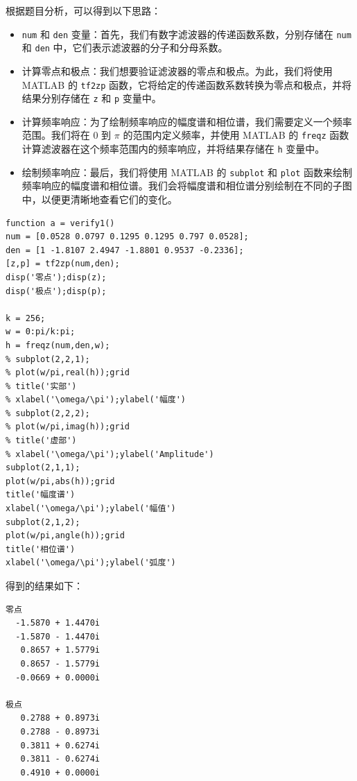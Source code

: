 \documentclass[a4paper,12pt]{article}
\begin{document}
根据题目分析，可以得到以下思路：

\begin{itemize}
    \item \texttt{num} 和 \texttt{den} 变量：首先，我们有数字滤波器的传递函数系数，分别存储在 \texttt{num} 和 \texttt{den} 中，它们表示滤波器的分子和分母系数。
    
    \item 计算零点和极点：我们想要验证滤波器的零点和极点。为此，我们将使用 MATLAB 的 \texttt{tf2zp} 函数，它将给定的传递函数系数转换为零点和极点，并将结果分别存储在 \texttt{z} 和 \texttt{p} 变量中。
    
    \item 计算频率响应：为了绘制频率响应的幅度谱和相位谱，我们需要定义一个频率范围。我们将在 0 到 $\pi$ 的范围内定义频率，并使用 MATLAB 的 \texttt{freqz} 函数计算滤波器在这个频率范围内的频率响应，并将结果存储在 \texttt{h} 变量中。
    
    \item 绘制频率响应：最后，我们将使用 MATLAB 的 \texttt{subplot} 和 \texttt{plot} 函数来绘制频率响应的幅度谱和相位谱。我们会将幅度谱和相位谱分别绘制在不同的子图中，以便更清晰地查看它们的变化。
\end{itemize}

\begin{lstlisting}
function a = verify1()
num = [0.0528 0.0797 0.1295 0.1295 0.797 0.0528];
den = [1 -1.8107 2.4947 -1.8801 0.9537 -0.2336];
[z,p] = tf2zp(num,den);
disp('零点');disp(z);
disp('极点');disp(p);

k = 256;
w = 0:pi/k:pi;
h = freqz(num,den,w);
% subplot(2,2,1); 
% plot(w/pi,real(h));grid 
% title('实部') 
% xlabel('\omega/\pi');ylabel('幅度') 
% subplot(2,2,2); 
% plot(w/pi,imag(h));grid 
% title('虚部') 
% xlabel('\omega/\pi');ylabel('Amplitude') 
subplot(2,1,1); 
plot(w/pi,abs(h));grid 
title('幅度谱') 
xlabel('\omega/\pi');ylabel('幅值') 
subplot(2,1,2); 
plot(w/pi,angle(h));grid 
title('相位谱') 
xlabel('\omega/\pi');ylabel('弧度')
\end{lstlisting}

得到的结果如下：

\begin{lstlisting}
零点
  -1.5870 + 1.4470i
  -1.5870 - 1.4470i
   0.8657 + 1.5779i
   0.8657 - 1.5779i
  -0.0669 + 0.0000i

极点
   0.2788 + 0.8973i
   0.2788 - 0.8973i
   0.3811 + 0.6274i
   0.3811 - 0.6274i
   0.4910 + 0.0000i
\end{lstlisting}
\end{document}
